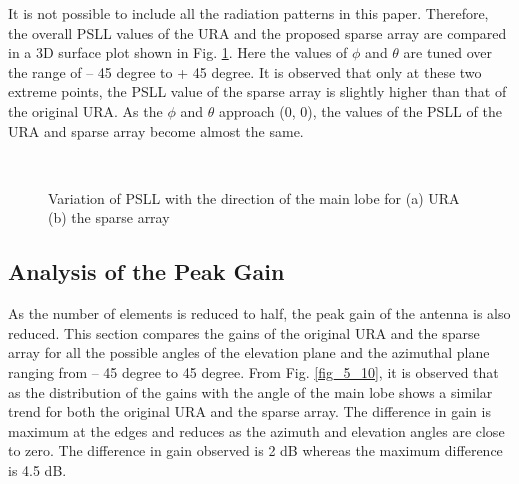 It is not possible to include all the radiation patterns in this paper. Therefore, the overall PSLL values of the URA and the proposed sparse array are compared in a 3D surface plot shown in Fig. \ref{fig_5_9}. Here the values of $\phi$ and $\theta$ are tuned over the range of -- 45 degree to + 45 degree. It is observed that only at these two extreme points, the PSLL value of the sparse array is slightly higher than that of the original URA. As the $\phi$ and $\theta$ approach (0, 0), the values of the PSLL of the URA and sparse array become almost the same.

\begin{figure}
  \centering
   ~~~~
  \\
  \caption{Variation of PSLL with the direction of the main lobe for (a) URA (b) the sparse array} \label{fig_5_9}
\end{figure}

\subsection{Analysis of the Peak Gain}

As the number of elements is reduced to half, the peak gain of the antenna is also reduced. This section compares the gains of the original URA and the sparse array for all the possible angles of the elevation plane and the azimuthal plane ranging from -- 45 degree to 45 degree. From Fig. \ref{fig_5_10}, it is observed that as the distribution of the gains with the angle of the main lobe shows a similar trend for both the original URA and the sparse array. The difference in gain is maximum at the edges and reduces as the azimuth and elevation angles are close to zero. The difference in gain observed is 2 dB whereas the maximum difference is 4.5 dB.

